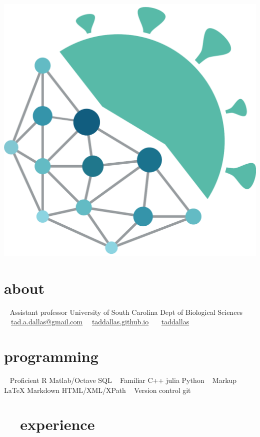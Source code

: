 \documentclass[]{CV}
\begin{document}

\begin{aside}
\vspace{-2cm}
\includegraphics[width=\textwidth]{dallasLab2.pdf}
  \section{about}
    ~
		Assistant professor
		University of South Carolina
		Dept of Biological Sciences
    ~
    \faEnvelope \ \  \href{mailto:tad.a.dallas@gmail.com}{tad.a.dallas@gmail.com}
    \faDesktop  \ \ \href{https://taddallas.github.io}{taddallas.github.io}
    \faGithub   \ \ \ \href{http://github.com/taddallas}{taddallas}
    ~
  \section{programming}
   ~
   {\mefont Proficient}
   R
   Matlab/Octave
   SQL
   ~
   {\mefont Familiar }
   C++
   julia
   Python
   ~
   {\mefont Markup}
   \LaTeX
   Markdown
   HTML/XML/XPath
   ~
   {\mefont Version control}
   git
\end{aside}





\section{\faFlask \ \ experience}
\end{document}
